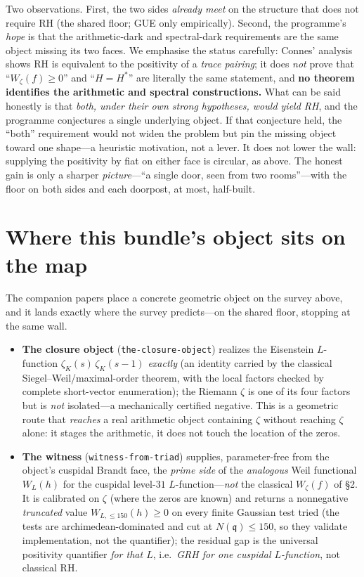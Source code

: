 \documentclass[11pt]{article}
\newcommand{\zetaK}{\zeta_{K}}\newcommand{\F}{\mathbb{F}}
\begin{document}
\noindent Two observations. First, the two sides \emph{already meet} on the structure
that does not require RH (the shared floor; GUE only empirically). Second, the
programme's \emph{hope} is that the arithmetic-dark and spectral-dark requirements are
the same object missing its two faces. We emphasise the status carefully: Connes'
analysis shows RH is equivalent to the positivity of a \emph{trace pairing}; it does
\emph{not} prove that ``$W_\zeta(f)\ge 0$'' and ``$H=H^*$'' are literally the same statement,
and \textbf{no theorem identifies the arithmetic and spectral constructions.} What can
be said honestly is that \emph{both, under their own strong hypotheses, would yield RH},
and the programme conjectures a single underlying object. If that conjecture held, the
``both'' requirement would not widen the problem but pin the missing object toward one
shape---a heuristic motivation, not a lever. It does not lower the wall: supplying the
positivity by fiat on either face is circular, as above. The honest gain is only a
sharper \emph{picture}---``a single door, seen from two rooms''---with the floor on both
sides and each doorpost, at most, half-built.

\section{Where this bundle's object sits on the map}\label{sec:object-on-map}
The companion papers place a concrete geometric object on the survey above, and it
lands exactly where the survey predicts---on the shared floor, stopping at the same wall.

\begin{itemize}\itemsep2pt
\item \textbf{The closure object} (\texttt{the-closure-object}) realizes the Eisenstein
$L$-function $\zetaK(s)\,\zetaK(s-1)$ \emph{exactly} (an identity carried by the classical
Siegel--Weil/maximal-order theorem, with the local factors checked by complete short-vector
enumeration); the Riemann $\zeta$ is one of its four factors but is
\emph{not} isolated---a mechanically certified negative. This is a geometric route that
\emph{reaches} a real arithmetic object containing $\zeta$ without reaching $\zeta$
alone: it stages the arithmetic, it does not touch the location of the zeros.
\item \textbf{The witness} (\texttt{witness-from-triad}) supplies, parameter-free from
the object's cuspidal Brandt face, the \emph{prime side} of the \emph{analogous} Weil
functional $W_L(h)$ for the cuspidal level-$31$ $L$-function---\emph{not} the classical
$W_\zeta(f)$ of \S2. It is calibrated on $\zeta$ (where the zeros are known) and returns a
nonnegative \emph{truncated} value $W_{L,\le150}(h)\ge0$ on every finite Gaussian test
tried (the tests are archimedean-dominated and cut at $N(\mathfrak q)\le150$, so they
validate implementation, not the quantifier); the residual gap is the universal positivity
quantifier \emph{for that $L$}, i.e.\ \emph{GRH for one cuspidal $L$-function}, not
classical RH.
\end{itemize}
\end{document}
